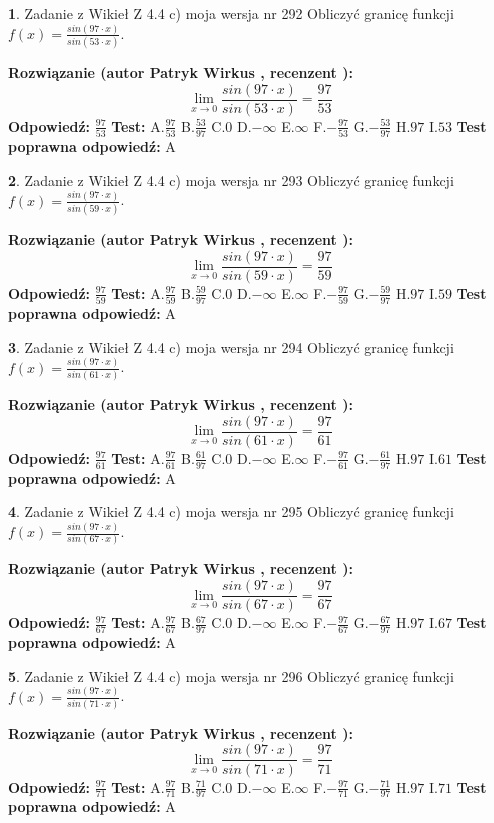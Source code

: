 \documentclass[12pt, a4paper]{article}
\theoremstyle{definition} %
\newtheorem{zad}{}
\newcommand{\zadStart}[1]{\begin{zad}#1\newline}
\newcommand{\zadStop}{\end{zad}}
\newcommand{\rozwStart}[2]{\noindent \textbf{Rozwiązanie (autor #1 , recenzent #2): }\newline}
\newcommand{\rozwStop}{\newline}
\newcommand{\odpStart}{\noindent \textbf{Odpowiedź:}\newline}
\newcommand{\odpStop}{\newline}
\newcommand{\testStart}{\noindent \textbf{Test:}\newline}
\newcommand{\testStop}{\newline}
\newcommand{\kluczStart}{\noindent \textbf{Test poprawna odpowiedź:}\newline}
\newcommand{\kluczStop}{\newline}
\begin{document}
\zadStart{Zadanie z Wikieł Z 4.4 c) moja wersja nr 292}
Obliczyć granicę funkcji $f(x)=\frac{sin(97\cdot x)}{sin(53\cdot x)}$.
\zadStop
\rozwStart{Patryk Wirkus}{}
$$\lim\limits_{x\to 0}\frac{sin(97\cdot x)}{sin(53\cdot x)}=
\frac{97}{53}$$
\rozwStop
\odpStart
$\frac{97}{53}$
\odpStop
\testStart
A.$\frac{97}{53}$
B.$\frac{53}{97}$
C.$0$
D.$-\infty$
E.$\infty$
F.$-\frac{97}{53}$
G.$-\frac{53}{97}$
H.$97$
I.$53$
\testStop
\kluczStart
A
\kluczStop



\zadStart{Zadanie z Wikieł Z 4.4 c) moja wersja nr 293}
Obliczyć granicę funkcji $f(x)=\frac{sin(97\cdot x)}{sin(59\cdot x)}$.
\zadStop
\rozwStart{Patryk Wirkus}{}
$$\lim\limits_{x\to 0}\frac{sin(97\cdot x)}{sin(59\cdot x)}=
\frac{97}{59}$$
\rozwStop
\odpStart
$\frac{97}{59}$
\odpStop
\testStart
A.$\frac{97}{59}$
B.$\frac{59}{97}$
C.$0$
D.$-\infty$
E.$\infty$
F.$-\frac{97}{59}$
G.$-\frac{59}{97}$
H.$97$
I.$59$
\testStop
\kluczStart
A
\kluczStop



\zadStart{Zadanie z Wikieł Z 4.4 c) moja wersja nr 294}
Obliczyć granicę funkcji $f(x)=\frac{sin(97\cdot x)}{sin(61\cdot x)}$.
\zadStop
\rozwStart{Patryk Wirkus}{}
$$\lim\limits_{x\to 0}\frac{sin(97\cdot x)}{sin(61\cdot x)}=
\frac{97}{61}$$
\rozwStop
\odpStart
$\frac{97}{61}$
\odpStop
\testStart
A.$\frac{97}{61}$
B.$\frac{61}{97}$
C.$0$
D.$-\infty$
E.$\infty$
F.$-\frac{97}{61}$
G.$-\frac{61}{97}$
H.$97$
I.$61$
\testStop
\kluczStart
A
\kluczStop



\zadStart{Zadanie z Wikieł Z 4.4 c) moja wersja nr 295}
Obliczyć granicę funkcji $f(x)=\frac{sin(97\cdot x)}{sin(67\cdot x)}$.
\zadStop
\rozwStart{Patryk Wirkus}{}
$$\lim\limits_{x\to 0}\frac{sin(97\cdot x)}{sin(67\cdot x)}=
\frac{97}{67}$$
\rozwStop
\odpStart
$\frac{97}{67}$
\odpStop
\testStart
A.$\frac{97}{67}$
B.$\frac{67}{97}$
C.$0$
D.$-\infty$
E.$\infty$
F.$-\frac{97}{67}$
G.$-\frac{67}{97}$
H.$97$
I.$67$
\testStop
\kluczStart
A
\kluczStop



\zadStart{Zadanie z Wikieł Z 4.4 c) moja wersja nr 296}
Obliczyć granicę funkcji $f(x)=\frac{sin(97\cdot x)}{sin(71\cdot x)}$.
\zadStop
\rozwStart{Patryk Wirkus}{}
$$\lim\limits_{x\to 0}\frac{sin(97\cdot x)}{sin(71\cdot x)}=
\frac{97}{71}$$
\rozwStop
\odpStart
$\frac{97}{71}$
\odpStop
\testStart
A.$\frac{97}{71}$
B.$\frac{71}{97}$
C.$0$
D.$-\infty$
E.$\infty$
F.$-\frac{97}{71}$
G.$-\frac{71}{97}$
H.$97$
I.$71$
\testStop
\kluczStart
A
\kluczStop
\end{document}
